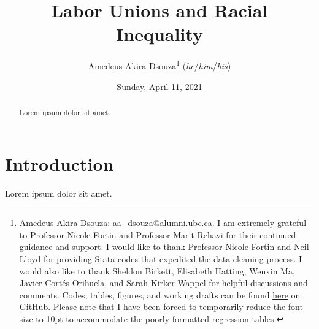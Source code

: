 \documentclass[11pt]{article}
\title{Labor Unions and Racial Inequality}
\author{Amedeus Akira Dsouza\thanks{Amedeus Akira Dsouza: \href{mailto:aa_dsouza@alumni.ubc.ca}{aa\_dsouza@alumni.ubc.ca}. I am extremely grateful to Professor Nicole Fortin and Professor Marit Rehavi for their continued guidance and support. I would like to thank Professor Nicole Fortin and Neil Lloyd for providing Stata codes that expedited the data cleaning process. I would also like to thank Sheldon Birkett, Elisabeth Hatting, Wenxin Ma, Javier Cort\'{e}s Orihuela, and Sarah Kirker Wappel for helpful discussions and comments. Codes, tables, figures, and working drafts can be found \href{https://github.com/aadsouza/econ499}{here} on GitHub. Please note that I have been forced to temporarily reduce the font size to 10pt to accommodate the poorly formatted regression tables.} \textsc{ (}\textit{he}\textsc{/}\textit{him}\textsc{/}\textit{his}\textsc{)}}
\affil{University of British Columbia}
\date{Sunday, April 11, 2021}
\begin{document}
\maketitle
\thispagestyle{empty}
\begin{abstract}
Lorem ipsum dolor sit amet.
\end{abstract}
\clearpage
{}
\section{Introduction}
Lorem ipsum dolor sit amet.

\end{document}
